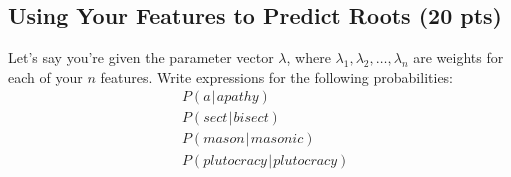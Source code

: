 \documentclass[11pt,twoside]{article}
\begin{document}
\subsection{Using Your Features to Predict Roots (20 pts)}
Let's say you're given the parameter vector $\lambda$, where $\lambda_1, \lambda_2, \dots, \lambda_n$ are weights for each of your $n$ features. Write expressions for the following probabilities:
\begin{align*}
& P \left( a \hspace{1pt}\vert\hspace{1pt} apathy \right)\\
& P \left( sect \hspace{1pt}\vert\hspace{1pt} bisect \right)\\
& P \left( mason \hspace{1pt}\vert\hspace{1pt} masonic \right)\\
& P \left( plutocracy \hspace{1pt}\vert\hspace{1pt} plutocracy \right)\\
\end{align*}


\end{document}
